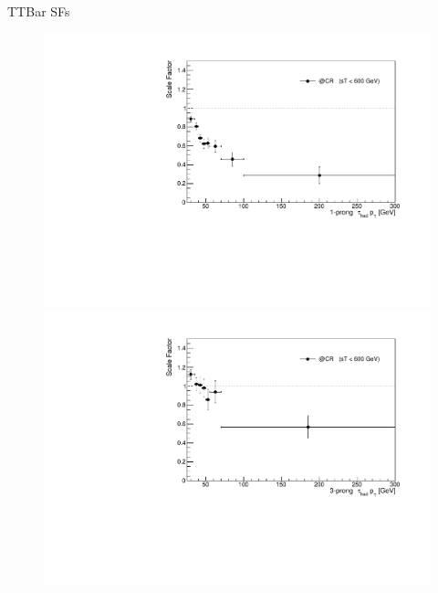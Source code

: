 \documentclass[aspectratio=46, dvipdfmx, 10pt, t]{beamer} %
\begin{document}
\begin{frame}{TTBar SFs}
  \vspace{15mm}
  \begin{figure}
    \setcounter{subfigure}{0}
    \centering
        \includegraphics[scale=0.29]{scale_factor_final_1P_notrigger}
        \includegraphics[scale=0.29]{scale_factor_final_3P_notrigger}
  \end{figure}
\end{frame}
\end{document}
